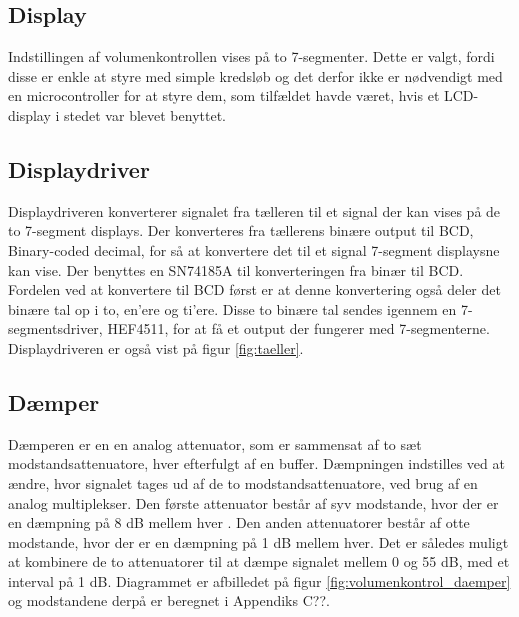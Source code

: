 \subsection*{Display}
\label{volumenkontrol-design-display}
Indstillingen af volumenkontrollen vises på to 7-segmenter. Dette er valgt, fordi disse er enkle at styre med simple kredsløb og det derfor ikke er nødvendigt med en microcontroller for at styre dem, som tilfældet havde været, hvis et LCD-display i stedet var blevet benyttet.

\subsection*{Displaydriver}
\label{volumenkontrol-design-display_driver}
Displaydriveren konverterer signalet fra tælleren til et signal der kan vises på de to 7-segment displays. Der konverteres fra tællerens binære output til BCD, Binary-coded decimal, for så at konvertere det til et signal 7-segment displaysne kan vise. Der benyttes en SN74185A til konverteringen fra binær til BCD. Fordelen ved at konvertere til BCD først er at denne konvertering også deler det binære tal op i to, en'ere og ti'ere. Disse to binære tal sendes igennem en 7-segmentsdriver, HEF4511, for at få et output der fungerer med 7-segmenterne. Displaydriveren er også vist på figur \ref{fig:taeller}.

\subsection*{Dæmper}
\label{volumenkontrol-design-daemper}
Dæmperen er en en analog attenuator, som er sammensat af to sæt modstandsattenuatore, hver efterfulgt af en buffer. Dæmpningen indstilles ved at ændre, hvor signalet tages ud af de to modstandsattenuatore, ved brug af en analog multiplekser. Den første attenuator består af syv modstande, hvor der er en dæmpning på 8 dB mellem hver . Den anden attenuatorer består af otte modstande, hvor der er en dæmpning på 1 dB mellem hver. Det er således muligt at kombinere de to attenuatorer til at dæmpe signalet mellem 0 og 55 dB, med et interval på 1 dB. Diagrammet er afbilledet på figur \ref{fig:volumenkontrol_daemper} og modstandene derpå er beregnet i Appendiks C??.

